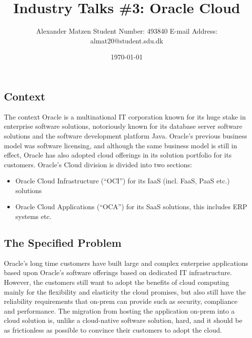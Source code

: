\documentclass[11pt]{article}
\begin{document}
\setlength\parindent{0pt}
\setlength{\parskip}{.15em}
\pagestyle{empty}

\title{Industry Talks \#3: Oracle Cloud}
\author{Alexander Matzen \addvspace{1em} Student Number: 493840 \newline E-mail Address: almat20@student.sdu.dk}
\date{\today}


\pagecolor{white}


\subsection*{Context}
The context
Oracle is a multinational IT corporation known for its huge stake in enterprise software solutions, notoriously known for its database server software solutions and the software development platform Java. Oracle’s previous business model was software licensing, and although the same business model is still in effect, Oracle has also adopted cloud offerings in its solution portfolio for its customers. Oracle’s Cloud division is divided into two sections:
\begin{itemize}
	\item Oracle Cloud Infrastructure (“OCI”) for its IaaS (incl. FaaS, PaaS etc.) solutions
	\item Oracle Cloud Applications (“OCA”) for its SaaS solutions, this includes ERP systems etc.
\end{itemize}

\subsection*{The Specified Problem}
Oracle’s long time customers have built large and complex enterprise applications based upon Oracle’s software offerings based on dedicated IT infrastructure. However, the customers still want to adopt the benefits of cloud computing mainly for the flexibility and elasticity the cloud promises, but also still have the reliability requirements that on-prem can provide such as security, compliance and performance. The migration from hosting the application on-prem into a cloud solution is, unlike a cloud-native software solution, hard, and it should be as frictionless as possible to convince their customers to adopt the cloud.
\end{document}

